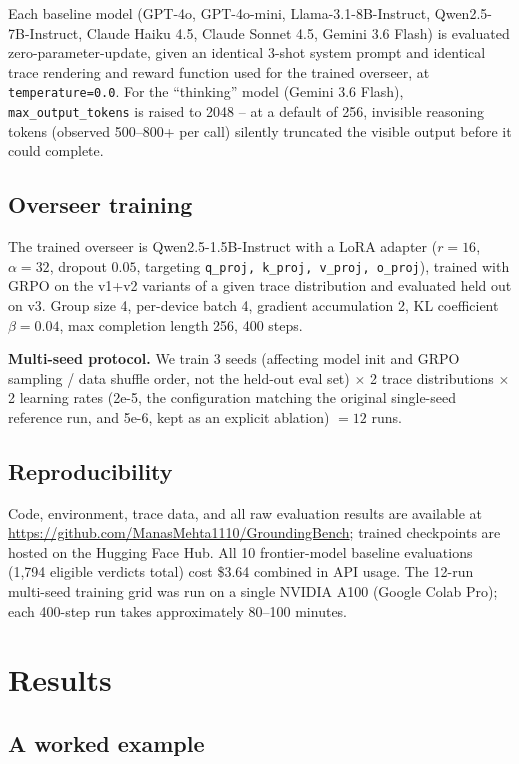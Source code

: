\documentclass[conference]{IEEEtran}
\begin{document}
Each baseline model (GPT-4o, GPT-4o-mini, Llama-3.1-8B-Instruct,
Qwen2.5-7B-Instruct, Claude Haiku 4.5, Claude Sonnet 4.5, Gemini 3.6 Flash)
is evaluated zero-parameter-update, given an identical 3-shot system prompt
and identical trace rendering and reward function used for the trained
overseer, at \texttt{temperature=0.0}. For the ``thinking'' model (Gemini
3.6 Flash), \texttt{max\_output\_tokens} is raised to 2048 -- at a default
of 256, invisible reasoning tokens (observed 500--800+ per call) silently
truncated the visible output before it could complete.

\subsection{Overseer training}

The trained overseer is Qwen2.5-1.5B-Instruct with a LoRA adapter ($r=16$,
$\alpha=32$, dropout $0.05$, targeting \texttt{q\_proj, k\_proj, v\_proj,
o\_proj}), trained with GRPO on the v1+v2 variants of a given trace
distribution and evaluated held out on v3. Group size 4, per-device batch
4, gradient accumulation 2, KL coefficient $\beta=0.04$, max completion
length 256, 400 steps.

\textbf{Multi-seed protocol.} We train 3 seeds (affecting model init and
GRPO sampling / data shuffle order, not the held-out eval set) $\times$ 2
trace distributions $\times$ 2 learning rates (2e-5, the configuration
matching the original single-seed reference run, and 5e-6, kept as an
explicit ablation) $= 12$ runs.

\subsection{Reproducibility}

Code, environment, trace data, and all raw evaluation results are available
at \url{https://github.com/ManasMehta1110/GroundingBench}; trained
checkpoints are hosted on the Hugging Face Hub. All 10 frontier-model
baseline evaluations (1,794 eligible verdicts total) cost \$3.64 combined in
API usage. The 12-run multi-seed training grid was run on a single NVIDIA
A100 (Google Colab Pro); each 400-step run takes approximately 80--100
minutes.

\section{Results}
\label{sec:results}

\subsection{A worked example}
\end{document}
